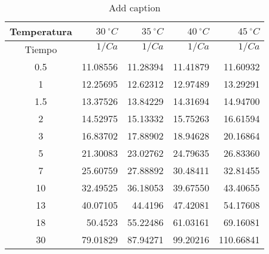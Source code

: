 \begin{table}[H]
    \centering
    \caption{Add caption}
      \begin{tabular}{crrrr}
      \hline
      \multicolumn{1}{l}{Temperatura} & $30\: ^{\circ} C$    & $35\: ^{\circ} C$    & $40\: ^{\circ} C$    & $45\: ^{\circ} C$ \\ \hline 
      \multicolumn{1}{c}{\multirow{2}[0]{*}{Tiempo}} & \multicolumn{1}{p{4.5em}}{$1/Ca$} & \multicolumn{1}{p{5.78em}}{$1/Ca$} & \multicolumn{1}{p{6em}}{$1/Ca$} & \multicolumn{1}{p{5.39em}}{$1/Ca$} \\ 
            &       &       &       &  \\ \hline
      0.5   & 11.08556 & 11.28394 & 11.41879 & 11.60932 \\
      1     & 12.25695 & 12.62312 & 12.97489 & 13.29291 \\
      1.5   & 13.37526 & 13.84229 & 14.31694 & 14.94700 \\
      2     & 14.52975 & 15.13332 & 15.75263 & 16.61594 \\
      3     & 16.83702 & 17.88902 & 18.94628 & 20.16864 \\
      5     & 21.30083 & 23.02762 & 24.79635 & 26.83360 \\
      7     & 25.60759 & 27.88892 & 30.48411 & 32.81455 \\
      10    & 32.49525 & 36.18053 & 39.67550 & 43.40655 \\
      13    & 40.07105 & 44.4196  & 47.42081 & 54.17608 \\
      18    & 50.4523  & 55.22486 & 61.03161 & 69.16081 \\
      30    & 79.01829 & 87.94271 & 99.20216 & 110.66841 \\ \hline
      \end{tabular}
    \label{tab:addlabel}
  \end{table}%
  